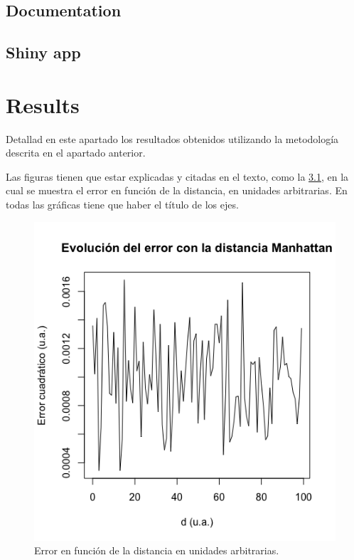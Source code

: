 \documentclass[ENG, BIB]{TFUOC}%
\begin{document}
\section{Documentation}


\section{Shiny app}
 


\chapter{Results}

Detallad en este apartado los resultados obtenidos utilizando la metodología descrita en el apartado anterior.

Las figuras tienen que estar explicadas y citadas en el texto, como la \ref{fig:my_label}, en la cual se muestra el error en función de la distancia, en unidades arbitrarias. En todas las gráficas tiene que haber el título de los ejes.

\begin{figure}[!htbp]
    \centering
    \includegraphics[width=7truecm]{Template/Rplotmanh.png}
    \caption{Error en función de la distancia en unidades arbitrarias.}
    \label{fig:my_label}
\end{figure}
\end{document}
